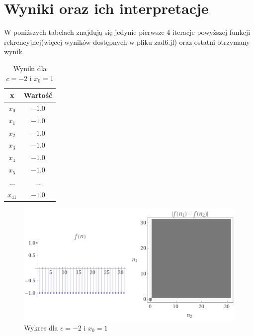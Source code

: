 \documentclass[a4paper,14pt]{report}
\begin{document}
  \section{Wyniki oraz ich interpretacje}
    W poniższych tabelach znajdują się jedynie pierwsze 4 iteracje powyższej funkcji rekrencyjnej(więcej wyników dostępnych w pliku zad6.jl) oraz ostatni otrzymany wynik.
    \begin{table}[H]
    \centering
    \begin{tabular}{|c | c |} 
     \hline
     x & Wartość \\ [0.5ex]
     \hline\hline
     $x_{0}$ & $-1.0$ \\
     $x_{1}$ & $-1.0$ \\
     $x_{2}$ & $-1.0$ \\
     $x_{3}$ & $-1.0$ \\
     $x_{4}$ & $-1.0$  \\
     $x_{5}$ & $-1.0$ \\
     ... & ... \\
     $x_{41}$ & $-1.0 $ \\
     \hline
    \end{tabular}
    \caption{Wyniki dla $c=-2$ i $x_{0}=1$}
    \label{Zad6a}
    \end{table}
    \begin{figure}[H]
      \includegraphics[scale=1.0]{wykresZad6a}
      \centering
      \caption{Wykres dla $c=-2$ i $x_{0}=1$}
    \end{figure}
\end{document}

